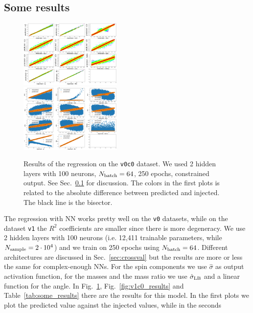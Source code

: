 \documentclass[prd,aps,twocolumn,a4paper,showkeys,nofootinbib]{revtex4-1}
\begin{document}
\subsection{Some results}
\label{sec:some_results}
%
\begin{figure}[]
  \center
  \includegraphics[width=0.45\textwidth]{./Figs/v0c0_regression.png}\\
  \includegraphics[width=0.45\textwidth]{./Figs/v0c0_regression_noise.png}
  \caption{\label{fig:v0c0_results} Results of the regression on the \texttt{v0c0}
  dataset. We used 2 hidden layers with 100 neurons, $N_{\rm batch}=64$, 250 epochs,  
  constrained output. See Sec.~\ref{sec:some_results} for discussion. 
  The colors in the first plots is related to the absolute difference between predicted 
  and injected. The black line is the bisector.}
\end{figure}
%
The regression with NN works pretty well on the \texttt{v0} datasets, while on 
the dataset \texttt{v1} the $R^2$ coefficients are smaller since there is more degeneracy.
We use 2 hidden layers with 100 neurons (i.e. 12,411 trainable parameters, while
$N_{\rm sample}=2\cdot 10^4$) and we train on 250 epochs using 
$N_{\rm batch}=64$. Different architectures are discussed in Sec.~\ref{sec:crossval}
but the results are more or less the same for complex-enough NNs.
For the spin components we use $\hat{\sigma}$ as output 
activation function, for the masses and the mass ratio we use $\hat{\sigma}_{\rm LB}$ and
a linear function for the angle. 
In Fig.~\ref{fig:v0c0_results}, Fig.~\ref{fig:v1c0_results} and Table~\ref{tab:some_results}
there are the results for this model.
In the first plots we plot the predicted value against the injected values, while in the seconds
\end{document}
